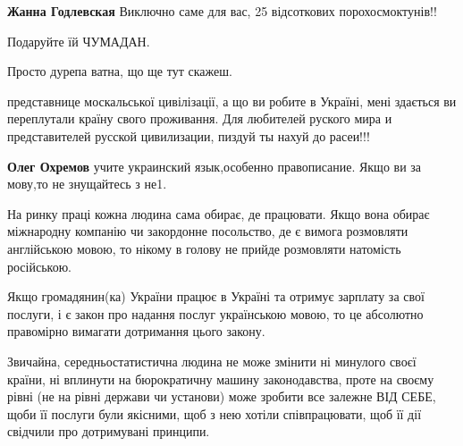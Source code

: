 \begin{itemize}
\begin{itemize}
\textbf{Жанна Годлевская} Виключно саме для вас, 25 відсоткових порохосмоктунів!!
\end{itemize}

 
Подаруйте їй ЧУМАДАН.

 
Просто дурепа ватна, що ще тут скажеш.

 

представнице москальської цивілізації, а що ви робите в Україні, мені здається
ви переплутали країну свого проживання. Для любителей руского мира и
представителей русской цивилизации, пиздуй ты нахуй до расеи!!!

\begin{itemize}
 
\textbf{Олег Охремов} учите украинский язык,особенно правописание. Якщо ви за мову,то не знущайтесь з не1.
\end{itemize}

 

На ринку праці кожна людина сама обирає, де працювати. Якщо вона обирає
міжнародну компанію чи закордонне посольство, де є вимога розмовляти
англійською мовою, то нікому в голову не прийде розмовляти натомість
російською. 

Якщо громадянин(ка) України працює в Україні та отримує зарплату за свої
послуги, і є закон про надання послуг українською мовою, то це абсолютно
правомірно вимагати дотримання цього закону. 

Звичайна, середньостатистична людина не може змінити ні минулого своєї країни,
ні вплинути на бюрократичну машину законодавства, проте на своєму рівні (не на
рівні держави чи установи) може зробити все залежне ВІД СЕБЕ, щоби її послуги
були якісними, щоб з нею хотіли співпрацювати, щоб її дії свідчили про
дотримувані принципи. 


\end{itemize}

